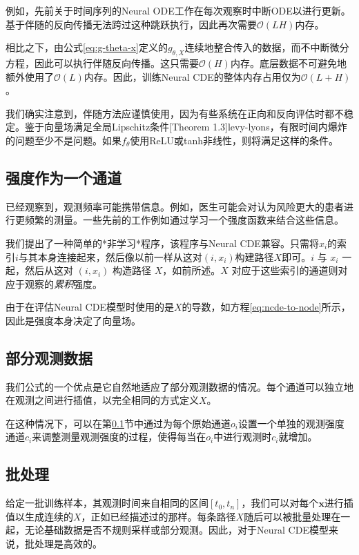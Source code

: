 \documentclass{ctexart}
\theoremstyle{plain}
\theoremstyle{definition}
\newcommand{\bigO}{\mathcal{O}}
\begin{document}
	例如，先前关于时间序列的Neural ODE工作\cite{latent-odes}在每次观察时中断ODE以进行更新。基于伴随的反向传播无法跨过这种跳跃执行，因此再次需要$\bigO(LH)$内存。%

	相比之下，由公式\eqref{eq:g-theta-x}定义的$g_{\theta, X}$连续地整合传入的数据，而不中断微分方程，因此可以执行伴随反向传播。这只需要$\bigO(H)$内存。底层数据不可避免地额外使用了$\bigO(L)$内存。因此，训练Neural CDE的整体内存占用仅为$\bigO(L + H)$。

	我们确实注意到，伴随方法应谨慎使用，因为有些系统在正向和反向评估时都不稳定\cite{anode, anode2}。鉴于向量场满足全局Lipschitz条件[Theorem 1.3]{levy-lyons}，有限时间内爆炸的问题至少不是问题。如果$f_\theta$使用ReLU或tanh非线性，则将满足这样的条件。

	\subsection{强度作为一个通道}\label{section:observational-intensity}
	已经观察到，观测频率可能携带信息\cite{Che2018}。例如，医生可能会对认为风险更大的患者进行更频繁的测量。一些先前的工作例如通过学习一个强度函数来结合这些信息\cite{interpolation-prediction, latent-odes, neural-odes}。

	我们提出了一种简单的*非学习*程序，该程序与Neural CDE兼容。只需将$x_i$的索引$i$与其本身连接起来，然后像以前一样从这对$(i, x_i)$构建路径$X$即可。$i$ 与 $x_i$ 一起，然后从这对 $(i, x_i)$ 构造路径 $X$，如前所述。$X$ 对应于这些索引的通道则对应于观察的\emph{累积}强度。

由于在评估Neural CDE模型时使用的是$X$的导数，如方程\eqref{eq:ncde-to-node}所示，因此是强度本身决定了向量场。

\subsection{部分观测数据}\label{section:partial}
我们公式的一个优点是它自然地适应了部分观测数据的情况。每个通道可以独立地在观测之间进行插值，以完全相同的方式定义$X$。

在这种情况下，可以在第\ref{section:observational-intensity}节中通过为每个原始通道$o_i$设置一个单独的观测强度通道$c_i$来调整测量观测强度的过程，使得每当在$o_i$中进行观测时$c_i$就增加。

\subsection{批处理}
给定一批训练样本，其观测时间来自相同的区间$[t_0, t_n]$，我们可以对每个$\mathbf{x}$进行插值以生成连续的$X$，正如已经描述过的那样。每条路径$X$随后可以被批量处理在一起，无论基础数据是否不规则采样或部分观测。因此，对于Neural CDE模型来说，批处理是高效的。
\end{document}
